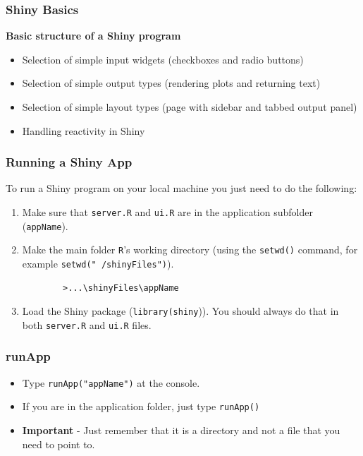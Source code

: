 \documentclass{beamer}
\begin{document}
\begin{frame}
	\frametitle{Shiny Basics}
	\Large
	\vspace{-0.5cm}
	\textbf{Basic structure of a Shiny program}
	\begin{itemize}
		\item  Selection of simple input widgets (checkboxes and radio buttons)
		\item  Selection of simple output types (rendering plots and returning text)
		\item  Selection of simple layout types (page with sidebar and tabbed output panel)
		\item  Handling reactivity in Shiny
	\end{itemize}
\end{frame}

\begin{frame}[fragile]
	\frametitle{Running a Shiny App}
	\Large
	To run a Shiny program on your local machine you just need to do the following:
	\begin{enumerate}
		\item  Make sure that \texttt{server.R} and \texttt{ui.R} are in the application subfolder (\texttt{appName}).
		\item Make the main folder \texttt{R}'s working directory (using the \texttt{setwd()} command, for
		example \texttt{setwd("~/shinyFiles")}).
		\begin{verbatim}
		>...\shinyFiles\appName
		\end{verbatim}
		\item Load the Shiny package (\texttt{library(shiny})). You
		should always do that in both \texttt{server.R} and \texttt{ui.R} files.
	\end{enumerate}
	
	
\end{frame}
\begin{frame}
	\frametitle{runApp}
	\Large
	\vspace{-1.5cm}
	\begin{itemize}
		\item Type \texttt{runApp("appName")} at the console.
		\item If you are in the application folder, just type \texttt{runApp()}
		\item \textbf{Important} - Just remember that it is a directory
		and not a file that you need to point to.
	\end{itemize}
\end{frame}
\end{document}
